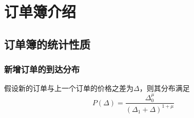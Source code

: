 \chapter{订单簿介绍}
\section{订单簿的统计性质}
\subsection{新增订单的到达分布}
假设新的订单与上一个订单的价格之差为$ \Delta $，则其分布满足
 \[ P(\Delta) = \frac{\Delta^\mu_0}{(\Delta_1+\Delta)^{1+\mu}} \]